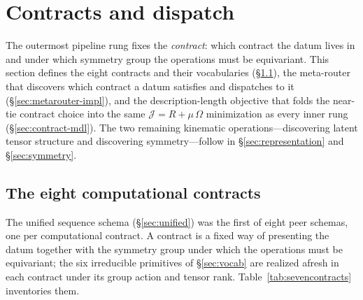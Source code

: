 \documentclass[11pt]{article}
\begin{document}
\section{Contracts and dispatch}
\label{sec:kinematics-group}

The outermost pipeline rung fixes the \emph{contract}: which contract the datum lives in and under which
symmetry group the operations must be equivariant. This section defines the eight contracts and their
vocabularies (\S\ref{sec:sevencontracts}), the meta-router that discovers which contract a datum
satisfies and dispatches to it (\S\ref{sec:metarouter-impl}), and the description-length objective that
folds the near-tie contract choice into the same $\mathcal J=R+\mu\,\Omega$ minimization as every inner
rung (\S\ref{sec:contract-mdl}). The two remaining kinematic operations---discovering latent tensor
structure and discovering symmetry---follow in \S\ref{sec:representation} and \S\ref{sec:symmetry}.

\subsection{The eight computational contracts}
\label{sec:sevencontracts}

The unified sequence schema (\S\ref{sec:unified}) was the first of eight peer schemas, one
per computational contract. A contract is a fixed way of presenting the datum together with the
symmetry group under which the operations must be equivariant; the six irreducible primitives of
\S\ref{sec:vocab} are realized afresh in each contract under its group action and tensor rank.
Table~\ref{tab:sevencontracts} inventories them.
\end{document}
